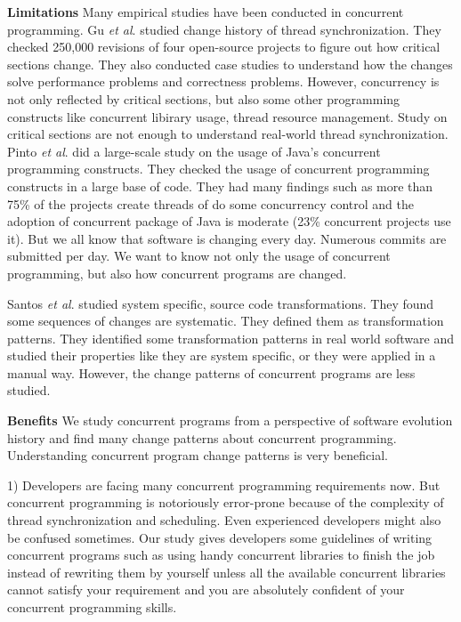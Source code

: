 \documentclass[conference]{IEEEtran}
\begin{document}
\textbf{Limitations} Many empirical studies have been conducted in concurrent programming. Gu \textit{et al}. \cite{conf/sigsoft/GuJSZL15} studied change history of thread synchronization. They checked 250,000 revisions of four open-source projects to figure out how critical sections change. They also conducted case studies to understand how the changes solve performance problems and correctness problems. However, concurrency is not only reflected by critical sections, but also some other programming constructs like concurrent libirary usage, thread resource management. Study on critical sections are not enough to understand real-world thread synchronization. Pinto \textit{et al}. \cite{journals/jss/PintoTFFB15} did a large-scale study on the usage of Java’s concurrent programming constructs. They checked the usage of concurrent programming constructs in a large base of code. They had many findings such as more than 75\% of the projects create threads of do some concurrency control and the adoption of concurrent package of Java is moderate (23\% concurrent projects use it). But we all know that software is changing every day. Numerous commits are submitted per day. We want to know not only the usage of concurrent programming, but also how concurrent programs are changed.

Santos \textit{et al}. \cite{conf/icsm/SantosAEDV15} studied system specific, source code transformations. They found some sequences of changes are systematic. They defined them as transformation patterns. They identified some transformation patterns in real world software and studied their properties like they are system specific, or they were applied in a manual way. However, the change patterns of concurrent programs are less studied.

\textbf{Benefits} We study concurrent programs from a perspective of software evolution history and find many change patterns about concurrent programming. Understanding concurrent program change patterns is very beneficial.

1) Developers are facing many concurrent programming requirements now. But concurrent programming is notoriously error-prone \cite{conf/asplos/LuPSZ08} because of the complexity of thread synchronization and scheduling. Even experienced developers might also be confused sometimes. Our study gives developers some guidelines of writing concurrent programs such as using handy concurrent libraries to finish the job instead of rewriting them by yourself unless all the available concurrent libraries cannot satisfy your requirement and you are absolutely confident of your concurrent programming skills.
\end{document}
